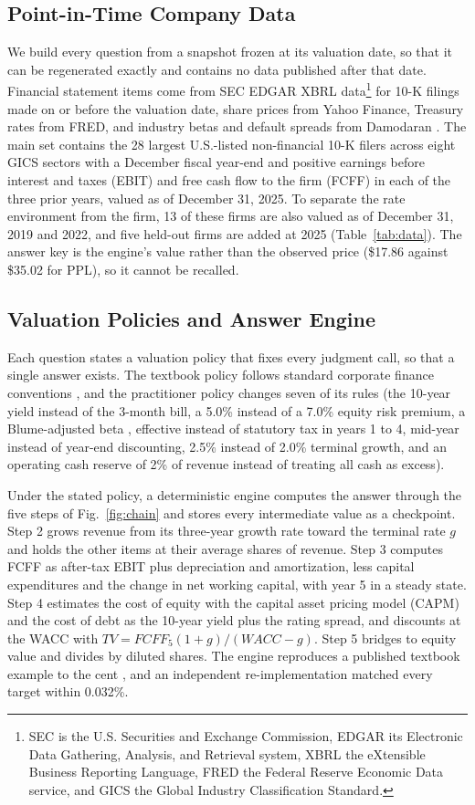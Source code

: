 \documentclass[conference]{IEEEtran}
\begin{document}
\subsection{Point-in-Time Company Data}\label{sec:data}
We build every question from a snapshot frozen at its valuation date, so that it can be regenerated exactly and contains no data published after that date. Financial statement items come from SEC EDGAR XBRL data\footnote{SEC is the U.S. Securities and Exchange Commission, EDGAR its Electronic Data Gathering, Analysis, and Retrieval system, XBRL the eXtensible Business Reporting Language, FRED the Federal Reserve Economic Data service, and GICS the Global Industry Classification Standard.} for 10-K filings made on or before the valuation date, share prices from Yahoo Finance, Treasury rates from FRED, and industry betas and default spreads from Damodaran \cite{b3}. The main set contains the 28 largest U.S.-listed non-financial 10-K filers across eight GICS sectors with a December fiscal year-end and positive earnings before interest and taxes (EBIT) and free cash flow to the firm (FCFF) in each of the three prior years, valued as of December 31, 2025. To separate the rate environment from the firm, 13 of these firms are also valued as of December 31, 2019 and 2022, and five held-out firms are added at 2025 (Table~\ref{tab:data}). The answer key is the engine's value rather than the observed price (\$17.86 against \$35.02 for PPL), so it cannot be recalled.

\subsection{Valuation Policies and Answer Engine}\label{sec:policy}
Each question states a valuation policy that fixes every judgment call, so that a single answer exists. The textbook policy follows standard corporate finance conventions \cite{b18}, and the practitioner policy changes seven of its rules (the 10-year yield instead of the 3-month bill, a 5.0\% \cite{b19} instead of a 7.0\% equity risk premium, a Blume-adjusted beta \cite{b20}, effective instead of statutory tax in years 1 to 4, mid-year instead of year-end discounting, 2.5\% instead of 2.0\% terminal growth, and an operating cash reserve of 2\% of revenue instead of treating all cash as excess).

Under the stated policy, a deterministic engine computes the answer through the five steps of Fig.~\ref{fig:chain} and stores every intermediate value as a checkpoint. Step 2 grows revenue from its three-year growth rate toward the terminal rate $g$ and holds the other items at their average shares of revenue. Step 3 computes FCFF as after-tax EBIT plus depreciation and amortization, less capital expenditures and the change in net working capital, with year 5 in a steady state. Step 4 estimates the cost of equity with the capital asset pricing model (CAPM) and the cost of debt as the 10-year yield plus the rating spread, and discounts at the WACC with \mbox{$\mathit{TV} = \mathit{FCFF}_5(1+g)/(\mathit{WACC}-g)$}. Step 5 bridges to equity value and divides by diluted shares. The engine reproduces a published textbook example to the cent \cite{b18}, and an independent re-implementation matched every target within 0.032\%.
\end{document}
